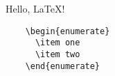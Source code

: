 \documentclass[12pt,a4paper,oneside]{article}
\begin{document}
  Hello, \LaTeX!
  \begin{verbatim}
    \begin{enumerate}
      \item one
      \item two
    \end{enumerate}
  \end{verbatim}
\end{document}
